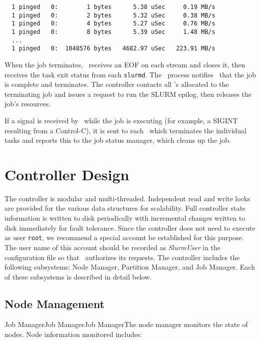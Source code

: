 \begin{verbatim}
  1 pinged   0:        1 bytes      5.38 uSec     0.19 MB/s                     
  1 pinged   0:        2 bytes      5.32 uSec     0.38 MB/s                     
  1 pinged   0:        4 bytes      5.27 uSec     0.76 MB/s                     
  1 pinged   0:        8 bytes      5.39 uSec     1.48 MB/s                     
  ...
  1 pinged   0:  1048576 bytes   4682.97 uSec   223.91 MB/s              
\end{verbatim}

When the job terminates, \srun\ receives an EOF on each stream and
closes it, then receives the task exit status from each {\tt slurmd}.
The \srun\ process notifies \slurmctld\ that the job is complete 
and terminates. The controller contacts all \slurmd 's allocated to the
terminating job and issues a request to run the SLURM epilog, then releases
the job's resources.

If a signal is received by \srun\ while the job is executing (for example,
a SIGINT resulting from a Control-C), it is sent to each \slurmd\ which 
terminates the individual tasks and reports this to the job status manager,
which cleans up the job.

\section{Controller Design}

The controller is modular and multi-threaded.  Independent read
and write locks are provided for the various data structures for
scalability.  Full controller state information is written to 
disk periodically with incremental changes written to disk immediately
for fault tolerance.  
Since the controller does not need to execute as user {\tt root}, 
we recommend a special account be established for this purpose.
The user name of this account should be recorded as {\em SlurmUser} 
in the configuration file so that \slurmd\ authorizes its requests.
The controller includes the following subsystems:
Node Manager, Partition Manager, and Job Manager.
Each of these subsystems is described in detail below.

\subsection{Node Management}

Job ManagerJob ManagerJob ManagerThe node manager monitors the state of nodes.  
Node information monitored includes:

